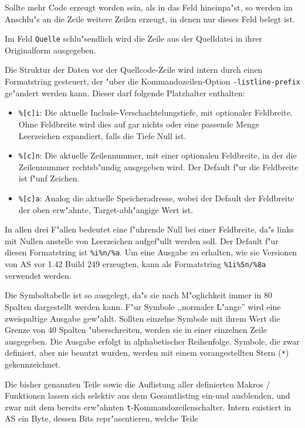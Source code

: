 \documentclass[12pt,a4paper,twoside]{report}
\newcommand{\tty}[1]{{\tt #1}}
\newcommand{\asname}{AS}
\begin{document}
\par
Sollte mehr Code erzeugt worden sein, als in das Feld hineinpa"st, so
werden im Anschlu"s an die Zeile weitere Zeilen erzeugt, in denen nur
dieses Feld belegt ist.
\par
Im Feld \tty{Quelle} schlu"sendlich wird die Zeile aus der Quelldatei in
ihrer Originalform ausgegeben.
\par
Die Struktur der Daten vor der Quellcode-Zeile wird intern
durch einen Formatstring gesteuert, der "uber die Kommandozeilen-Option
{\tt -listline-prefix} ge"andert werden kann.  Dieser darf folgende
Platzhalter enthalten:
\begin{itemize}
\item{{\tt \%[c]i}: Die aktuelle Include-Verschachtelungstiefe, mit optionaler
      Feldbreite.  Ohne Feldbreite wird dies auf gar nichts oder eine
      passende Menge Leerzeichen expandiert, falls die Tiefe Null ist.}
\item{{\tt \%[c]n}: Die aktuelle Zeilennummer, mit einer optionalen Feldbreite,
      in der die Zeilennummer rechtsb"undig ausgegeben wird.  Der Default
      f"ur die Feldbreite ist f"unf Zeichen.}
\item{{\tt \%[c]a}: Analog die aktuelle Speicheradresse, wobei der Default
      der Feldbreite der oben erw"ahnte, Target-abh"angige Wert ist.}
\end{itemize}
In allen drei F"allen bedeutet eine f"uhrende Null bei einer Feldbreite, da"s
links mit Nullen anstelle von Leerzeichen aufgef"ullt werden soll.
Der Default f"ur diesen Formatstring ist \verb!%i%n/%a!.  Um eine Ausgabe
zu erhalten, wie sie Versionen von \asname{} vor 1.42 Build 249 erzeugten,
kann als Formatstring \verb!%1i%5n/%8a! verwendet werden.
\par
Die Symboltabelle ist so ausgelegt, da"s sie nach M"oglichkeit immer in 80
Spalten dargestellt werden kann.  F"ur Symbole ,,normaler L"ange'' wird
eine zweispaltige Ausgabe gew"ahlt.  Sollten einzelne Symbole mit ihrem
Wert die Grenze von 40 Spalten "uberschreiten, werden sie in einer
einzelnen Zeile ausgegeben.  Die Ausgabe erfolgt in alphabetischer
Reihenfolge.  Symbole, die zwar definiert, aber nie benutzt wurden,
werden mit einem vorangestellten Stern (\verb!*!) gekennzeichnet.
\par
Die bisher genannten Teile sowie die Auflistung aller definierten
Makros / Funktionen lassen sich selektiv aus dem Gesamtlisting ein-und
ausblenden, und zwar mit dem bereits erw"ahnten \tty{t}-Kommandozeilenschalter.
Intern existiert in \asname{} ein Byte, dessen Bits repr"asentieren, welche Teile
\end{document}
